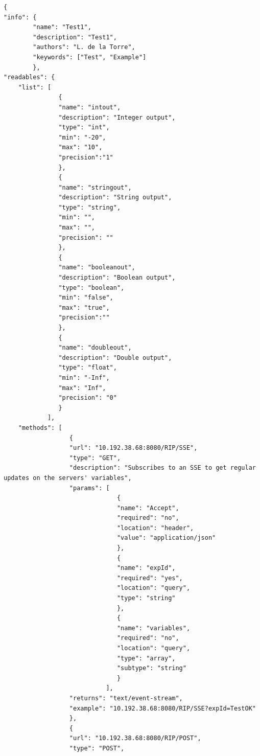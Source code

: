 \begin{lstlisting}
{
"info": {
        "name": "Test1",
        "description": "Test1",
        "authors": "L. de la Torre",
        "keywords": ["Test", "Example"]
        },
"readables": {
    "list": [
               {
               "name": "intout",
               "description": "Integer output",
               "type": "int",
               "min": "-20",
               "max": "10",
               "precision":"1"
               },
               {
               "name": "stringout",
               "description": "String output",
               "type": "string",
               "min": "",
               "max": "",
               "precision": ""
               },
               {
               "name": "booleanout",
               "description": "Boolean output",
               "type": "boolean",
               "min": "false",
               "max": "true",
               "precision":""
               },
               {
               "name": "doubleout",
               "description": "Double output",
               "type": "float",
               "min": "-Inf",
               "max": "Inf",
               "precision": "0"
               }
            ],
    "methods": [  
                  {
                  "url": "10.192.38.68:8080/RIP/SSE",
                  "type": "GET",
                  "description": "Subscribes to an SSE to get regular updates on the servers' variables",
                  "params": [
                               {
                               "name": "Accept",
                               "required": "no",
                               "location": "header",
                               "value": "application/json"
                               },
                               {
                               "name": "expId",
                               "required": "yes",
                               "location": "query",
                               "type": "string"
                               },
                               {
                               "name": "variables",
                               "required": "no",
                               "location": "query",
                               "type": "array",
                               "subtype": "string"
                               }
                            ],
                  "returns": "text/event-stream",
                  "example": "10.192.38.68:8080/RIP/SSE?expId=TestOK"
                  },
                  {
                  "url": "10.192.38.68:8080/RIP/POST",
                  "type": "POST",

\end{lstlisting}
